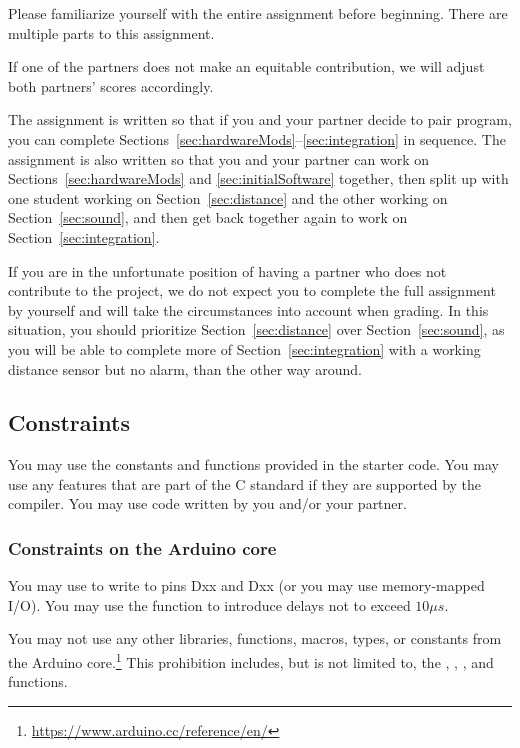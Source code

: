 Please familiarize yourself with the entire assignment before beginning.
There are multiple parts to this assignment.

If one of the partners does not make an equitable contribution, we will adjust both partners' scores accordingly.

The assignment is written so that if you and your partner decide to pair program, you can complete Sections~\ref{sec:hardwareMods}--\ref{sec:integration} in sequence.
The assignment is also written so that you and your partner can work on Sections~\ref{sec:hardwareMods} and \ref{sec:initialSoftware} together, then split up with one student working on Section~\ref{sec:distance} and the other working on Section~\ref{sec:sound}, and then get back together again to work on Section~\ref{sec:integration}.

If you are in the unfortunate position of having a partner who does not contribute to the project, we do not expect you to complete the full assignment by yourself and will take the circumstances into account when grading.
In this situation, you should prioritize Section~\ref{sec:distance} over Section~\ref{sec:sound}, as you will be able to complete more of Section~\ref{sec:integration} with a working distance sensor but no alarm, than the other way around.

\subsection{Constraints} \label{subsec:constraints}

You may use the constants and functions provided in the starter code.
You may use any features that are part of the C standard if they are supported by the compiler.
You may use code written by you and/or your partner.

\subsubsection{Constraints on the Arduino core}

You may use  to write to pins Dxx and Dxx (or you may use memory-mapped I/O).
You may use the  function to introduce delays not to exceed $10\mu s$.

You may not use any other libraries, functions, macros, types, or constants from the Arduino core.\footnote{
    \url{https://www.arduino.cc/reference/en/}
}
This prohibition includes, but is not limited to, the , , , and  functions.


